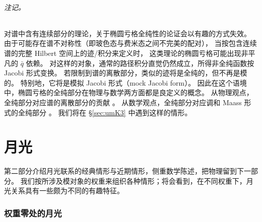 \documentclass[11pt,a4paper,fontset=windows]{ctexart}
\numberwithin{equation}{section}
\newcommand{\myparagraph}[1]{\paragraph{#1}\mbox\\}
\begin{document}


\myparagraph{注记。}
对谱中含有连续部分的理论，关于椭圆亏格全纯性的论证会以有趣的方式失效。
由于可能存在谱不对称性（即玻色态与费米态之间不完美的配对），
当按包含连续谱的完整 Hilbert 空间上的迹/积分来定义时，
这类理论的椭圆亏格可能出现非平凡的 $\bar q$ 依赖。
对这样的对象，通常的路径积分直觉仍然成立，所得非全纯函数按 Jacobi 形式变换。
若限制到谱的离散部分，类似的迹将是全纯的，但不再是模的。
特别地，它将是模拟 Jacobi 形式（mock Jacobi form）。
因此在这个语境中，椭圆亏格的全纯部分在物理与数学两方面都是良定义的概念。
从物理观点，全纯部分对应谱的离散部分的贡献
\cite{Hanany:2002ev,Troost:2010ud,Eguchi:2010cb,Ashok:2011cy}。
从数学观点，全纯部分对应调和 Maass 形式的全纯部分 \cite{MR2097357}。
我们将在 \S\ref{sec:umK3} 中遇到这样的情形。



\part{月光}
第二部分介绍月光联系的经典情形与近期情形，侧重数学陈述，把物理留到下一部分。
我们按所涉及模对象的权重来组织各种情形；将会看到，在不同权重下，月光关系具有一些颇为不同的有趣特征。


\section{权重零处的月光}
\label{cha:weight0}
\end{document}
